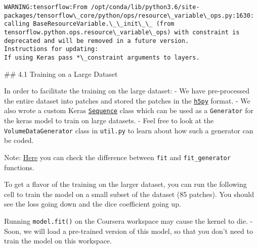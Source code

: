 \documentclass[11pt]{article}
\begin{document}
    \begin{Verbatim}[commandchars=\\\{\}]
WARNING:tensorflow:From /opt/conda/lib/python3.6/site-packages/tensorflow\_core/python/ops/resource\_variable\_ops.py:1630: calling BaseResourceVariable.\_\_init\_\_ (from tensorflow.python.ops.resource\_variable\_ops) with constraint is deprecated and will be removed in a future version.
Instructions for updating:
If using Keras pass *\_constraint arguments to layers.

    \end{Verbatim}

     \#\# 4.1 Training on a Large Dataset

In order to facilitate the training on the large dataset: - We have
pre-processed the entire dataset into patches and stored the patches in
the \href{http://docs.h5py.org/en/stable/}{\texttt{h5py}} format. - We
also wrote a custom Keras
\href{https://www.tensorflow.org/api_docs/python/tf/keras/utils/Sequence}{\texttt{Sequence}}
class which can be used as a \texttt{Generator} for the keras model to
train on large datasets. - Feel free to look at the
\texttt{VolumeDataGenerator} class in \texttt{util.py} to learn about
how such a generator can be coded.

Note:
\href{https://www.geeksforgeeks.org/keras-fit-and-keras-fit_generator/}{Here}
you can check the difference between \texttt{fit} and
\texttt{fit\_generator} functions.

To get a flavor of the training on the larger dataset, you can run the
following cell to train the model on a small subset of the dataset (85
patches). You should see the loss going down and the dice coefficient
going up.

Running \texttt{model.fit()} on the Coursera workspace may cause the
kernel to die. - Soon, we will load a pre-trained version of this model,
so that you don't need to train the model on this workspace.
\end{document}

